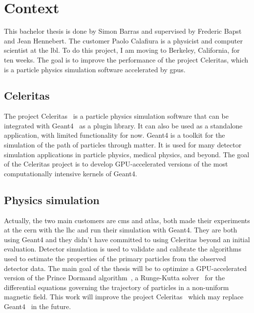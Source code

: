 \chapter{Context}
\label{spec:ch:context}

This bachelor thesis is done by Simon Barras and supervised by Frederic Bapst and Jean Hennebert.
The customer Paolo Calafiura is a physicist and computer scientist at the \acrfull{lbl}.
To do this project, I am moving to Berkeley, California, for ten weeks.
The goal is to improve the performance of the project Celeritas, which is a particle physics simulation software accelerated by \acrshort{gpu}s.




\section{Celeritas}
\label{spec:ch:context:celeritas}

The project Celeritas~\cite{Celeritas-Project} is a particle physics simulation software that can be integrated with Geant4~\cite{geant4} as a plugin library.
It can also be used as a standalone application, with limited functionality for now.
Geant4 is a toolkit for the simulation of the path of particles through matter.
It is used for many detector simulation applications in particle physics, medical physics, and beyond.
The goal of the Celeritas project is to develop GPU-accelerated versions of the most computationally intensive kernels of Geant4.

\section{Physics simulation}
\label{spec:ch:context:physics-simulation}

Actually, the two main customers are \acrshort{cms} and \acrshort{atlas}, both made their experiments at the \acrfull{cern} with the \acrfull{lhc} and run their simulation with Geant4.
They are both using Geant4 and they didn't have committed to using Celeritas beyond an initial evaluation.
Detector simulation is used to validate and calibrate the algorithms used to estimate the properties of the primary particles from the observed detector data.
The main goal of the thesis will be to optimize a GPU-accelerated version of the Prince Dormand algorithm~\cite{princeDormand}, a Runge-Kutta solver~\cite{Runge-Kutta-methods} for the differential equations governing the trajectory of particles in a non-uniform magnetic field.
This work will improve the project Celeritas~\cite{Celeritas-Project} which may replace Geant4~\cite{geant4} in the future.

